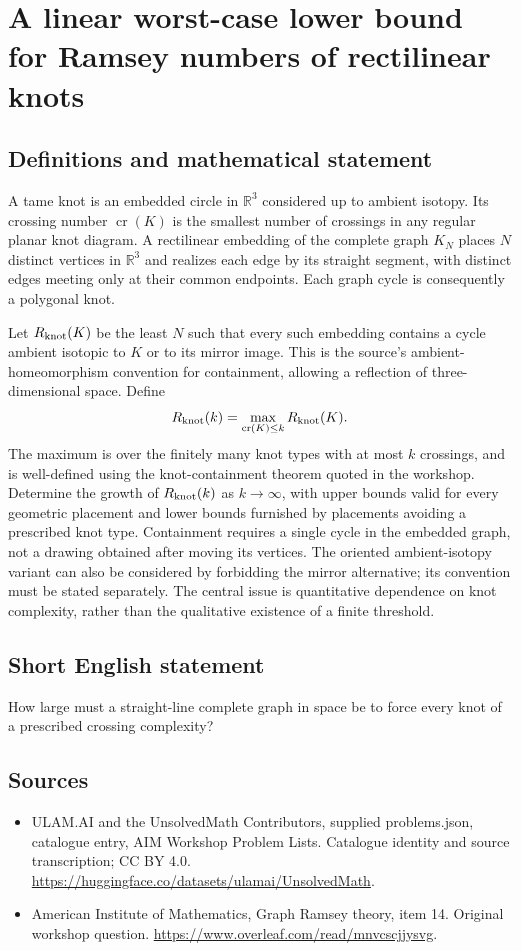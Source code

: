 \documentclass[11pt,a4paper]{article}
\begin{document}
\section*{A linear worst-case lower bound for Ramsey numbers of rectilinear knots}\label{statement}

\subsection{Definitions and mathematical statement}
A tame knot is an embedded circle in $\mathbb R^3$ considered up to ambient isotopy.
Its crossing number $\operatorname{cr}(K)$ is the smallest number of crossings in any regular planar knot diagram.
A rectilinear embedding of the complete graph $K_N$ places $N$ distinct vertices in $\mathbb R^3$ and realizes each edge by its straight segment, with distinct edges meeting only at their common endpoints.
Each graph cycle is consequently a polygonal knot.

Let $R_{\rm knot}(K)$ be the least $N$ such that every such embedding contains a cycle ambient isotopic to $K$ or to its mirror image.
This is the source's ambient-homeomorphism convention for containment, allowing a reflection of three-dimensional space.
Define
\[
 R_{\rm knot}(k)=\max_{\operatorname{cr}(K)\leq k}R_{\rm knot}(K).
\]
The maximum is over the finitely many knot types with at most $k$ crossings, and is well-defined using the knot-containment theorem quoted in the workshop.
Determine the growth of $R_{\rm knot}(k)$ as $k\to\infty$, with upper bounds valid for every geometric placement and lower bounds furnished by placements avoiding a prescribed knot type.
Containment requires a single cycle in the embedded graph, not a drawing obtained after moving its vertices.
The oriented ambient-isotopy variant can also be considered by forbidding the mirror alternative; its convention must be stated separately.
The central issue is quantitative dependence on knot complexity, rather than the qualitative existence of a finite threshold.
\subsection{Short English statement}
How large must a straight-line complete graph in space be to force every knot of a prescribed crossing complexity?
\subsection{Sources}
\begin{itemize}
\item[S1] ULAM.AI and the UnsolvedMath Contributors, supplied problems.json, catalogue entry, AIM Workshop Problem Lists. Catalogue identity and source transcription; CC BY 4.0.
\url{https://huggingface.co/datasets/ulamai/UnsolvedMath}.
\item[S2] American Institute of Mathematics, Graph Ramsey theory, item 14. Original workshop question.
\url{https://www.overleaf.com/read/mnvcscjjysvg}.
\end{itemize}
\end{document}
